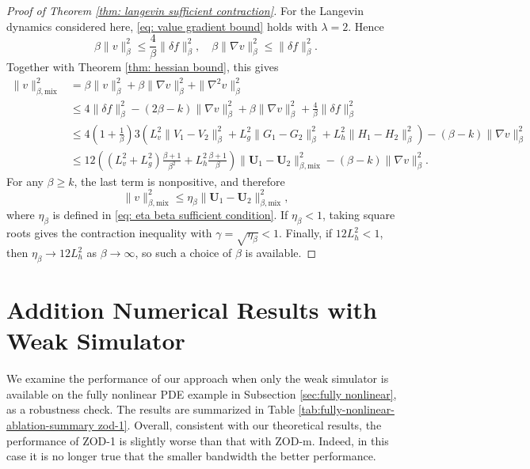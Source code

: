 \documentclass[twoside,11pt]{article}
\newcommand{\1}{\mathbf{1}}
\numberwithin{equation}{section}
\begin{document}
\begin{proof}[Proof of Theorem \ref{thm: langevin sufficient contraction}]
For the Langevin dynamics considered here, \eqref{eq: value gradient bound} holds with $\lambda=2$. Hence
\begin{equation}
    \beta\|v\|_{\beta}^2  \le \frac{4}{\beta}\|\delta f\|_{\beta}^2,\quad  \beta\|\nabla v\|_{\beta}^2 \le \|\delta f\|_{\beta}^2.
\end{equation}
Together with Theorem \ref{thm: hessian bound}, this gives
\begin{equation}
\begin{aligned}
    \|v\|^2_{\beta,\textrm{mix}} &= \beta\|v\|_{\beta}^2 + \beta\|\nabla v\|_{\beta}^2 + \|\nabla^2 v\|_{\beta}^2\\
    &\le 4\|\delta f\|_{\beta}^2 - (2\beta -k)\|\nabla v\|_{\beta}^2 + \beta\|\nabla v\|_{\beta}^2 + \frac{4}{\beta}\|\delta f\|_{\beta}^2\\
    & \le 4(1+\frac{1}{\beta}) 3\left(L_v^2 \|V_1-V_2\|_{\beta}^2 + L_g^2 \|G_1-G_2\|_{\beta}^2 + L_h^2\|H_1-H_2\|_{\beta}^2\right) - (\beta - k)\|\nabla v\|_{\beta}^2\\
    &\le 12\left((L_v^2+L_g^2)\frac{\beta+1}{\beta^2}+L_h^2\frac{\beta+1}{\beta}\right)\|\mathbf U_1-\mathbf U_2\|^2_{\beta,\textrm{mix}} -  (\beta - k)\|\nabla v\|_{\beta}^2.
\end{aligned}
\end{equation}
For any $\beta\ge k$, the last term is nonpositive, and therefore
\begin{equation}
    \|v\|^2_{\beta,\textrm{mix}}
    \le \eta_\beta \|\mathbf U_1-\mathbf U_2\|^2_{\beta,\textrm{mix}},
\end{equation}
where $\eta_\beta$ is defined in \eqref{eq: eta beta sufficient condition}. If $\eta_\beta<1$, taking square roots gives the contraction inequality with $\gamma=\sqrt{\eta_\beta}<1$. Finally, if $12L_h^2<1$, then $\eta_\beta\to 12L_h^2$ as $\beta\to\infty$, so such a choice of $\beta$ is available.
\end{proof}

\section{Addition Numerical Results with Weak Simulator}
\label{appendix:addition zod-1}
We examine the performance of our approach when only the weak simulator is available on the fully nonlinear PDE example in Subsection \ref{sec:fully nonlinear}, as a robustness check. The results are summarized in Table \ref{tab:fully-nonlinear-ablation-summary zod-1}. Overall, consistent with our theoretical results, the performance of ZOD-1 is slightly worse than that with ZOD-m. Indeed, in this case it is no longer true that the smaller  bandwidth the better performance.
\end{document}
